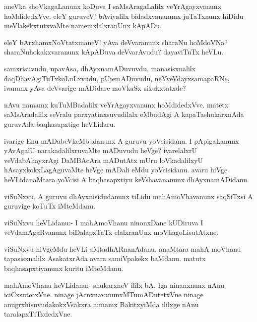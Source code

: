 \documentclass{article}
\begin{document}
\begin{mn}
aneVka shoVkagaLanunx koDuva I saMsAragaLalilx veYrAgayxvanunx
hoMdidedxVve. eleY guruveV! bAviyalilx bidadxvananunx juTaTxnunx
hiDidu meVlakekxtutxvaMte namemxlalxranUnx kApADu.
\end{mn}

\begin{mn}
eleY bArxhamxNoVtatxmaneV! yAva deVvaranunx sharaNu hoMdoVNa?
sharaNuhokakxvaranunx kApADuva deVvarAvudu? dayaviTuTx heVLu.
\end{mn}

\begin{mn}
samxrisuvudu, upavAsa, dhAyxnamADuvuvdu, manasisxnalilx
daqDhavAgiTuTxkoLuLxvudu, pUjemADuvudu, neYveVdayxsamapaRNe, ivanunx
yAva deVvarige mADidare moVkaSx sikukxtatxde?
\end{mn}

\begin{mn}
nAvu namamx kuTuMBadalilx veYrAgayxvanunx hoMdidedxVve. matetx
saMsAradalilx seVralu parxyatinxsuvudilalx eMbudAgi A
kapaTashukarxnAda guruvAda baqhasapxtige heVLidaru.
\end{mn}

\begin{mn}%
ivarige Enu mADabeVkeMbudanunx A guruvu yoVcisidanu. I pApigaLanunx
yAvAgalU narakadalilxruvaMte mADuvudu heVge? ivarelalxrU
veVdabAhayxrAgi DaMBAcAra mADutAtx mUru loVkadalilxyU
hAsayxkokxLagAguvaMte heVge mADali eMdu yoVcisidanu. avaru hiVge
heVLidanaMtara yoVcisi A baqhasapxtiyu keVshavananunx dhAyxnamADidanu.
\end{mn}

\begin{mn}
viSuNxvu, A guruvu dhAyxnisidudanunx tiLidu mahAmoVhavanunx saqSiTxsi
A guruvige koTuTx iMteMdanu.
\end{mn}

\begin{mn}
viSuNxvu heVLidanu:- I mahAmoVhanu ninonxDane kUDiruva I
veVdamAgaRvanunx biDalapxTaTx elalxranUnx moVhagoLisutAtxne.
\end{mn}

\begin{mn}
viSuNxvu hiVgeMdu heVLi aMtadhARnanAdanu. anaMtara mahA moVhanu
tapasisxnalilx AsakatxrAda avara samiVpakekx baMdanu. matutx
baqhasapxtiyanunx kuritu iMteMdanu.
\end{mn}

\begin{mn}%
mahAmoVhanu heVLidanu:- shukarxneV ililx bA. Iga ninanxnunx nAnu
iciCxsutetxVne. ninage jAcnxnavanunxMTumADutetxVne ninage
anugrxhisuvudakokxVsakxra nimamx BakitxyiMda ililxge nAnu taralapxTiTxdedxVne.
\end{mn}
\end{document}
